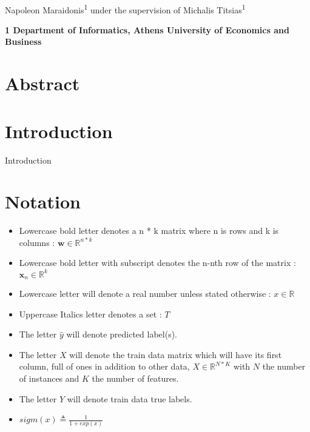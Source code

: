 \documentclass[10pt,letterpaper]{article}
\begin{document}
\vspace*{0.35in}
	\begin{flushleft}
		{\Large
			\textbf{}
		}
		\newline
		\\
		Napoleon Maraidonis\textsuperscript{1} under the supervision of
		Michalis Titsias\textsuperscript{1}		
						
		\bigskip
		\bf{1} Department of Informatics, Athens University of Economics and Business
		\\		
	\end{flushleft}
	
	\section*{Abstract}
	
	
	\section*{Introduction}
	
	Introduction \cite{extreme_MLC_omar} \cite{extreme_MLC_rep} \cite{MLC_finland}
	

	\section*{Notation}

	\begin{itemize}
		\item Lowercase bold letter denotes a n * k matrix where n is rows and k is columns :  $\textbf{w} \in  {\mathbb R}^{n * k}$
		
		\item Lowercase bold letter with subscript denotes the n-nth row of the matrix : $\textbf{x}_{n} \in  {\mathbb R}^{k}$
				
		\item Lowercase letter will denote a real number unless stated otherwise	:	$x \in {\mathbb R}$
		
		\item Uppercase Italics letter denotes a set : $\textit{T} $
		
		\item The letter $\hat{y}$ will denote predicted label(s).
		
		\item The letter $X$ will denote the train data matrix which will have its first column, full of ones in addition to other data, $X \in {\mathbb R}^{N * K}$ with $N$ the number of instances and $K$ the number of features.
		
		\item The letter $Y$ will denote train data true labels.
		
		\item $sigm(x) \triangleq \frac{1}{1 + exp(x)}$
		
		

	\end{itemize}
	\newpage
	
\end{document}
